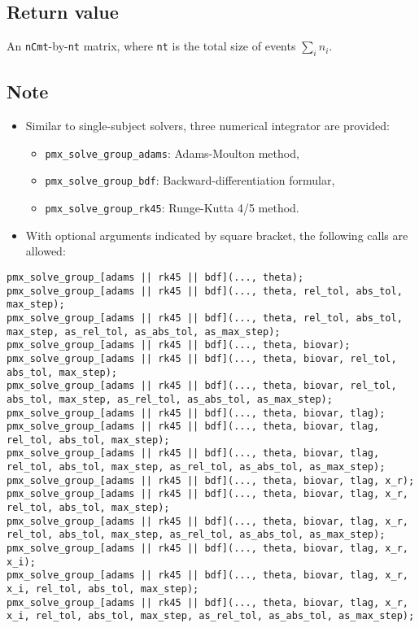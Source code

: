 \documentclass[12pt, reqno, oneside]{amsbook}
\numberwithin{equation}{chapter}
\numberwithin{figure}{chapter}
\numberwithin{table}{chapter}
\theoremstyle{remark}
\begin{document}
\subsection{Return value}
\label{sec:org0635278}
An \texttt{nCmt}-by-\texttt{nt} matrix, where \texttt{nt} is the total size of
events \(\sum_{i}n_i\).
\subsection{Note}
\label{sec:ode_pop_note}
\begin{itemize}
\item Similar to single-subject solvers, three numerical integrator are provided:
\begin{itemize}
\item \texttt{pmx\_solve\_group\_adams}: Adams-Moulton method,
\item \texttt{pmx\_solve\_group\_bdf}: Backward-differentiation formular,
\item \texttt{pmx\_solve\_group\_rk45}: Runge-Kutta 4/5 method.
\end{itemize}
\item With optional arguments indicated by square bracket, the following calls are allowed:
\end{itemize}
\begin{verbatim}
pmx_solve_group_[adams || rk45 || bdf](..., theta);
pmx_solve_group_[adams || rk45 || bdf](..., theta, rel_tol, abs_tol, max_step);
pmx_solve_group_[adams || rk45 || bdf](..., theta, rel_tol, abs_tol, max_step, as_rel_tol, as_abs_tol, as_max_step);
pmx_solve_group_[adams || rk45 || bdf](..., theta, biovar);
pmx_solve_group_[adams || rk45 || bdf](..., theta, biovar, rel_tol, abs_tol, max_step);
pmx_solve_group_[adams || rk45 || bdf](..., theta, biovar, rel_tol, abs_tol, max_step, as_rel_tol, as_abs_tol, as_max_step);
pmx_solve_group_[adams || rk45 || bdf](..., theta, biovar, tlag);
pmx_solve_group_[adams || rk45 || bdf](..., theta, biovar, tlag, rel_tol, abs_tol, max_step);
pmx_solve_group_[adams || rk45 || bdf](..., theta, biovar, tlag, rel_tol, abs_tol, max_step, as_rel_tol, as_abs_tol, as_max_step);
pmx_solve_group_[adams || rk45 || bdf](..., theta, biovar, tlag, x_r);
pmx_solve_group_[adams || rk45 || bdf](..., theta, biovar, tlag, x_r, rel_tol, abs_tol, max_step);
pmx_solve_group_[adams || rk45 || bdf](..., theta, biovar, tlag, x_r, rel_tol, abs_tol, max_step, as_rel_tol, as_abs_tol, as_max_step);
pmx_solve_group_[adams || rk45 || bdf](..., theta, biovar, tlag, x_r, x_i);
pmx_solve_group_[adams || rk45 || bdf](..., theta, biovar, tlag, x_r, x_i, rel_tol, abs_tol, max_step);
pmx_solve_group_[adams || rk45 || bdf](..., theta, biovar, tlag, x_r, x_i, rel_tol, abs_tol, max_step, as_rel_tol, as_abs_tol, as_max_step);
\end{verbatim}
\end{document}
